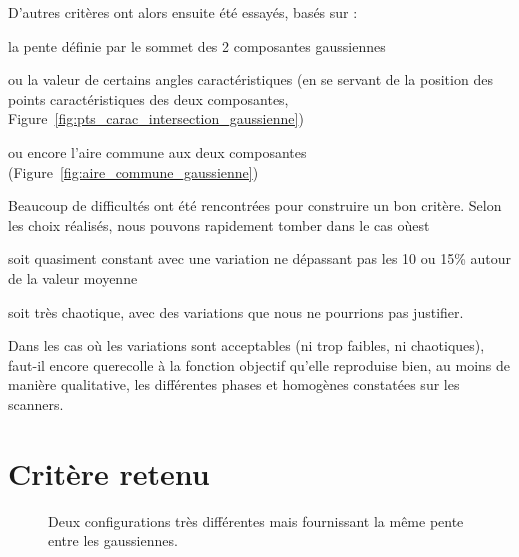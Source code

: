 \documentclass[main.tex]{subfiles}
\begin{document}
D'autres critères ont alors ensuite été essayés, basés sur :
\begin{myitemize}
\item la pente définie par le sommet des 2 composantes gaussiennes
\item ou la valeur de certains angles caractéristiques (en se servant de la position des points caractéristiques des deux composantes, \cf Figure~\ref{fig:pts_carac_intersection_gaussienne})
\item ou encore l'aire commune aux deux composantes (\cf Figure~\ref{fig:aire_commune_gaussienne})
\end{myitemize}
Beaucoup de difficultés ont été rencontrées pour construire un bon critère. Selon les choix réalisés, nous pouvons rapidement tomber dans le cas où\HH est 
\begin{myitemize}
\item soit quasiment constant avec une variation ne dépassant pas les 10 ou 15\% autour de la valeur moyenne
\item soit très chaotique, avec des variations que nous ne pourrions pas justifier.
\end{myitemize}
Dans les cas où les variations sont acceptables (ni trop faibles, ni chaotiques), faut-il encore que\HH recolle à la fonction objectif \ie qu'elle reproduise bien, au moins de manière qualitative, les différentes phases \heterogenes et homogènes constatées sur les scanners. %


\section{Critère retenu}
\begin{figure}
\centering
{}
\caption{\label{fig:pente_gaussienne_identique}Deux configurations très différentes mais fournissant la même pente entre les gaussiennes.}
\end{figure}
\end{document}
